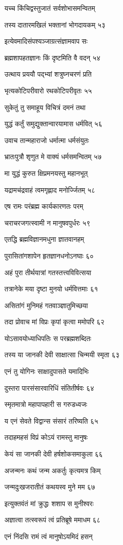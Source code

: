 यच्च किंचिद्वस्तुजातं सर्वशोभासमन्वितम्

तस्य दातारमखिलं भक्तानां भोगदायकम् ५३

इत्येवमादिसंपश्यञ्जाग्रत्संज्ञामवाप सः

ब्रह्मशापहतज्ञानः किं दृष्टमिति वै वदन् ५४

उत्थाय प्रययौ पद्भ्यां शत्रुघ्नचरणं प्रति

भृत्यकोटिपरीवारो रथकोटिपरीवृतः ५५

सुकेतुं तु समाहूय विचित्रं दमनं तथा

युद्धं कर्तुं समुद्युक्तान्वारयामास धर्मवित् ५६

उवाच तान्महाराजो धर्मात्मा धर्मसंयुतः

भ्रातःपुत्रौ शृणुत मे वाक्यं धर्मसमन्वितम् ५७

मा युद्धं कुरुत क्षिप्रमनयस्तु महानभूत्

यद्रामचंद्रवाहं त्वमगृह्णाद मनोर्ज्जितम् ५८

एष रामः परंब्रह्म कार्यकारणतः परम्

चराचरजगत्स्वामी न मानुषवपुर्धरः ५९

एतद्धि ब्रह्मविज्ञानमधुना ज्ञातवानहम्

पुरासितांगशापेन हृतज्ञानधनोऽनघाः ६०

अहं पुरा तीर्थयात्रां गतस्तत्त्वविवित्सया

तत्रानेके मया दृष्टा मुनयो धर्मवित्तमाः ६१

असितांगं मुनिमहं गतवाञ्ज्ञातुमिच्छया

तदा प्रोवाच मां विप्रः कृपां कृत्वा ममोपरि ६२

योऽसावयोध्याधिपतिः स परब्रह्मशब्दितः

तस्य या जानकी देवी साक्षात्सा चिन्मयी स्मृता ६३

एनं तु योगिनः साक्षादुपासते यमादिभिः

दुस्तरा पारसंसारवारिधिं संतितीर्षवः ६४

स्मृतमात्रो महापापहारी स गरुडध्वजः

य एनं सेवते विद्वान्स संसारं तरिष्यति ६५

तदाहमहसं विप्रं कोऽयं रामस्तु मानुषः

केयं सा जानकी देवी हर्षशोकसमाकुला ६६

अजन्मनः कथं जन्म अकर्तुः कृत्यमत्र किम्

जन्मदुःखजरातीतं कथयस्व मुने मम ६७

इत्युक्तवंतं मां क्रुद्धः शशाप स मुनीश्वरः

अज्ञात्वा तत्स्वरूपं त्वं प्रतिब्रूषे ममाधम ६८

एनं निंदसि रामं त्वं मानुषोऽयमिदं हसन्

